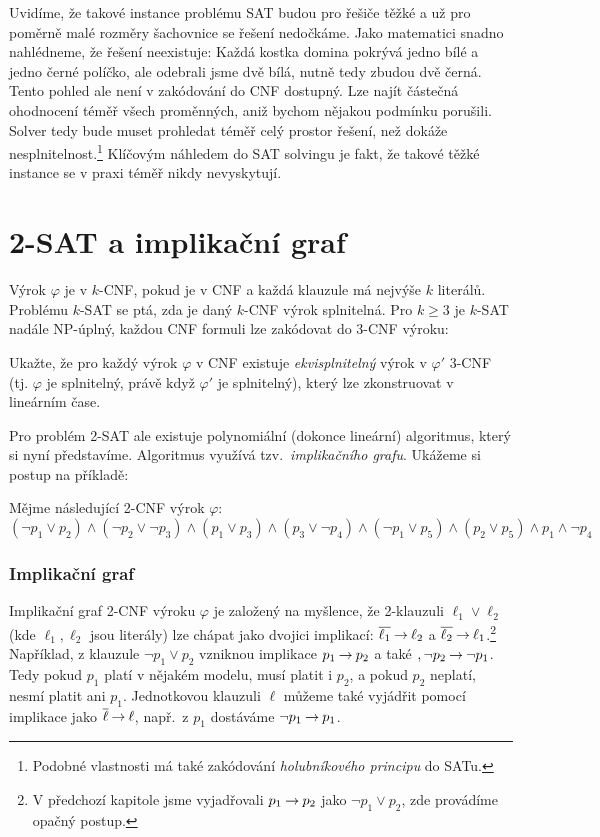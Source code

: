 Uvidíme, že takové instance problému SAT budou pro řešiče těžké a už pro poměrně malé rozměry šachovnice se řešení nedočkáme. Jako matematici snadno nahlédneme, že řešení neexistuje: Každá kostka domina pokrývá jedno bílé a jedno černé políčko, ale odebrali jsme dvě bílá, nutně tedy zbudou dvě černá. Tento pohled ale není v zakódování do CNF dostupný. Lze najít částečná ohodnocení téměř všech proměnných, aniž bychom nějakou podmínku porušili. Solver tedy bude muset prohledat téměř celý prostor řešení, než dokáže nesplnitelnost.\footnote{Podobné vlastnosti má také zakódování \emph{holubníkového principu} do SATu.} Klíčovým náhledem do SAT solvingu je fakt, že takové těžké instance se v praxi téměř nikdy nevyskytují.

\section{2-SAT a implikační graf}

Výrok $\varphi$ je v $k$-CNF, pokud je v CNF a každá klauzule má nejvýše $k$ literálů. Problému $k$-SAT se ptá, zda je daný $k$-CNF výrok splnitelná. Pro $k\geq 3$ je $k$-SAT nadále NP-úplný, každou CNF formuli lze zakódovat do 3-CNF výroku:

\begin{exercise}
Ukažte, že pro každý výrok $\varphi$ v CNF existuje \emph{ekvisplnitelný} výrok v $\varphi'$ 3-CNF (tj. $\varphi$ je splnitelný, právě když $\varphi'$ je splnitelný), který lze zkonstruovat v lineárním čase.
\end{exercise}

Pro problém 2-SAT ale existuje polynomiální (dokonce lineární) algoritmus, který si nyní představíme. Algoritmus využívá tzv.\ \emph{implikačního grafu}. Ukážeme si postup na příkladě:
\begin{example}
    Mějme následující 2-CNF výrok $\varphi$:
    $$
    (\neg p_1 \lor p_2) \land (\neg p_2 \lor \neg p_3) \land (p_1\lor p_3) \land (p_3\lor \neg p_4)\land (\neg p_1\lor p_5)\land (p_2\lor p_5)\land p_1\land \neg p_4
    $$
\end{example}

\subsubsection{Implikační graf}

Implikační graf 2-CNF výroku $\varphi$ je založený na myšlence, že 2-klauzuli $\ell_1\lor \ell_2$ (kde $\ell_1,\ell_2$ jsou literály) lze chápat jako dvojici implikací: $\overline{\ell_1}\mathbin{\rightarrow}\ell_2$ a $\overline{\ell_2}\mathbin{\rightarrow} \ell_1$.\footnote{V předchozí kapitole jsme vyjadřovali $p_1\mathbin{\rightarrow} p_2$ jako $\neg p_1\lor p_2$, zde provádíme opačný postup.} Například, z klauzule $\neg p_1\lor p_2$ vzniknou implikace $p_1\mathbin{\rightarrow} p_2$ a také $,\neg p_2\mathbin{\rightarrow} \neg p_1$. Tedy pokud $p_1$ platí v nějakém modelu, musí platit i $p_2$, a pokud $p_2$ neplatí, nesmí platit ani $p_1$. Jednotkovou klauzuli $\ell$ můžeme také vyjádřit pomocí implikace jako $\overline{\ell}\mathbin{\rightarrow}\ell$, např.\ z $p_1$ dostáváme $\neg p_1\mathbin{\rightarrow} p_1$.

